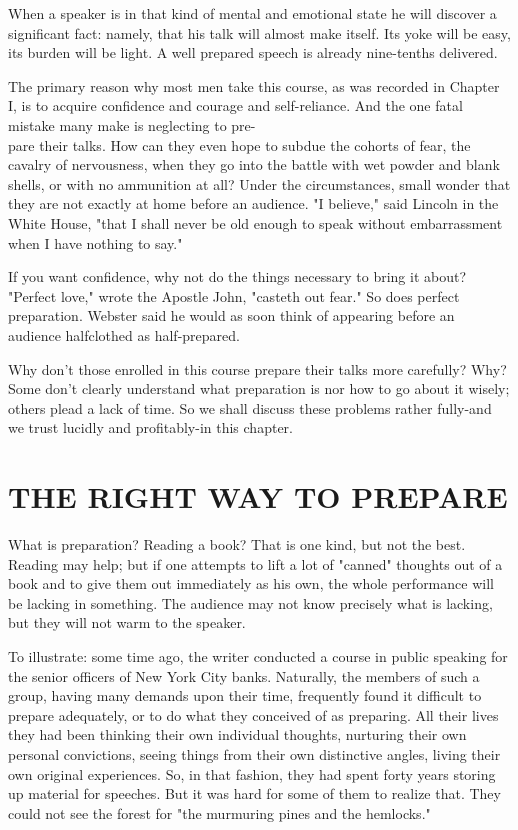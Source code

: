 \documentclass[10pt]{article}
\begin{document}
When a speaker is in that kind of mental and emotional state he will discover a significant fact: namely, that his talk will almost make itself. Its yoke will be easy, its burden will be light. A well prepared speech is already nine-tenths delivered.

The primary reason why most men take this course, as was recorded in Chapter I, is to acquire confidence and courage and self-reliance. And the one fatal mistake many make is neglecting to pre-\\
pare their talks. How can they even hope to subdue the cohorts of fear, the cavalry of nervousness, when they go into the battle with wet powder and blank shells, or with no ammunition at all? Under the circumstances, small wonder that they are not exactly at home before an audience. "I believe," said Lincoln in the White House, "that I shall never be old enough to speak without embarrassment when I have nothing to say."

If you want confidence, why not do the things necessary to bring it about? "Perfect love," wrote the Apostle John, "casteth out fear." So does perfect preparation. Webster said he would as soon think of appearing before an audience halfclothed as half-prepared.

Why don't those enrolled in this course prepare their talks more carefully? Why? Some don't clearly understand what preparation is nor how to go about it wisely; others plead a lack of time. So we shall discuss these problems rather fully-and we trust lucidly and profitably-in this chapter.

\section*{THE RIGHT WAY TO PREPARE}
What is preparation? Reading a book? That is one kind, but not the best. Reading may help; but if one attempts to lift a lot of "canned" thoughts out of a book and to give them out immediately as his own, the whole performance will be lacking in something. The audience may not know precisely what is lacking, but they will not warm to the speaker.

To illustrate: some time ago, the writer conducted a course in public speaking for the senior officers of New York City banks. Naturally, the members of such a group, having many demands upon their time, frequently found it difficult to prepare adequately, or to do what they conceived of as preparing. All their lives they had been thinking their own individual thoughts, nurturing their own personal convictions, seeing things from their own distinctive angles, living their own original experiences. So, in that fashion, they had spent forty years storing up material for speeches. But it was hard for some of them to realize that. They could not see the forest for "the murmuring pines and the hemlocks."
\end{document}
